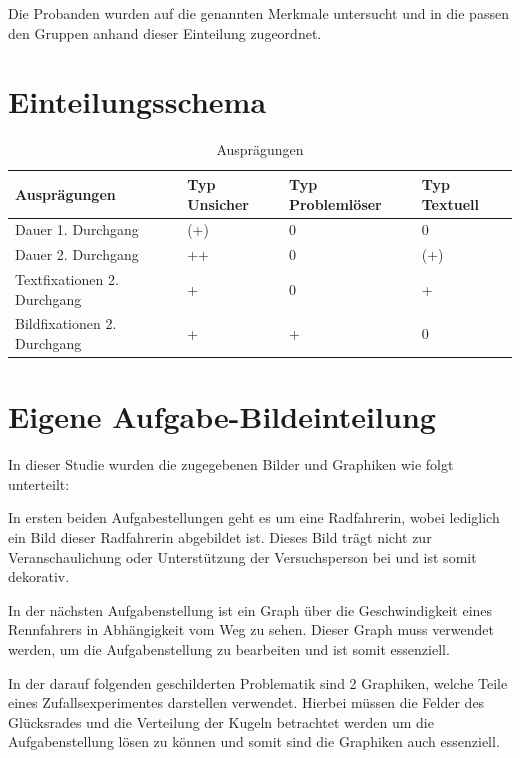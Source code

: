 Die Probanden wurden auf die genannten Merkmale untersucht und in die passen den Gruppen anhand dieser Einteilung zugeordnet.
\section*{Einteilungsschema}

\begin{table}[!h]
\hspace{-5pt}
\begin{tabularx}{\textwidth + 5pt}{| @{\hspace{3pt}} M || @{\hspace{3pt}} M  | @{\hspace{3pt}} M  | @{\hspace{3pt}} M |}
\hline
\textbf{Ausprägungen} & \textbf{Typ Unsicher} & \textbf{Typ Problemlöser} & \textbf{Typ Textuell}\\
\hline
\hline
Dauer 1. Durchgang          & (+) & 0 & 0\\
\hline
Dauer 2. Durchgang          & ++ & 0 & (+)\\
\hline
Textfixationen 2. Durchgang & + & 0 & +\\
\hline
Bildfixationen 2. Durchgang & + & + & 0\\
\hline
\end{tabularx}
\caption{Ausprägungen}
\end{table}

\section{Eigene Aufgabe-Bildeinteilung}

In dieser Studie wurden die zugegebenen Bilder und Graphiken wie folgt unterteilt:

In ersten beiden Aufgabestellungen geht es um eine Radfahrerin, wobei lediglich ein Bild dieser Radfahrerin abgebildet ist. Dieses Bild trägt nicht zur Veranschaulichung oder Unterstützung der Versuchsperson bei und ist somit dekorativ. 


In der nächsten Aufgabenstellung ist ein Graph über die Geschwindigkeit eines Rennfahrers in Abhängigkeit vom Weg zu sehen. Dieser Graph muss verwendet werden, um die Aufgabenstellung zu bearbeiten und ist somit essenziell. 


In der darauf folgenden geschilderten Problematik sind 2 Graphiken, welche Teile eines Zufallsexperimentes darstellen verwendet. Hierbei müssen die Felder des Glücksrades und die Verteilung der Kugeln betrachtet werden um die Aufgabenstellung lösen zu können und somit sind die Graphiken auch essenziell.


